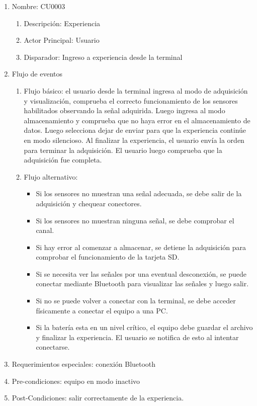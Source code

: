 	\begin{enumerate} 
		\item Nombre: CU0003
		\begin{enumerate} [label*=\arabic*.]
			\item Descripción: Experiencia
			\item Actor Principal: Usuario
			\item Disparador: Ingreso a experiencia desde la terminal
		\end{enumerate}
		\item Flujo de eventos
		\begin{enumerate} [label*=\arabic*.]
			\item Flujo básico: el usuario desde la terminal ingresa al modo de adquisición y visualización, comprueba el correcto funcionamiento de los sensores habilitados observando la señal adquirida. Luego ingresa al modo almacenamiento y comprueba que no haya error en el almacenamiento de datos. Luego selecciona dejar de enviar para que la experiencia continúe en modo silencioso. Al finalizar la experiencia, el usuario envía la orden para terminar la adquisición. El usuario luego comprueba que la adquisición fue completa.
			\item Flujo alternativo:
			\begin{itemize}
				\item Si los sensores no muestran una señal adecuada, se debe salir de la adquisición y chequear conectores.
				\item Si los sensores no muestran ninguna señal, se debe comprobar el canal.
				\item Si hay error al comenzar a almacenar, se detiene la adquisición para comprobar el funcionamiento de la tarjeta SD.
				\item Si se necesita ver las señales por una eventual desconexión, se puede conectar mediante Bluetooth para visualizar las señales y luego salir. 
				\item Si no se puede volver a conectar con la terminal, se debe acceder físicamente a conectar el equipo a una PC.
				\item Si la batería esta en un nivel crítico, el equipo debe guardar el archivo y finalizar la experiencia. El usuario se notifica de esto al intentar conectarse.					
			\end{itemize}				
		\end{enumerate}

		\item Requerimientos especiales: conexión Bluetooth
		\item Pre-condiciones: equipo en modo inactivo
		\item Post-Condiciones: salir correctamente de la experiencia.
	\end{enumerate}

